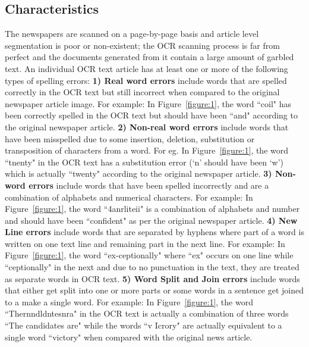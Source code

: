 \subsection{Characteristics}
The newspapers are scanned on a page-by-page basis and article level
segmentation is poor or non-existent; the OCR scanning process is far
from perfect and the documents generated from it contain a large
amount of garbled text.
An individual OCR text article has at least one or more of the following types of spelling errors:
 \textbf{1) Real word errors}	 include words that are spelled correctly in the OCR text but still incorrect when compared to the original newspaper article image. For example: In Figure~\ref{figure:1}, the word ``coil"  has been correctly spelled in the OCR text  but should have been ``and" according to the original newspaper article. 
 \textbf{2) Non-real word errors} include words that have been misspelled due to some insertion, deletion, substitution or transposition of characters from a word. For eg. In Figure~\ref{figure:1}, the word ``tnenty" in the OCR text has a substitution error (`n' should have been `w') which is actually ``twenty" according to the original newspaper article.
 \textbf{3) Non-word errors} include words that have been spelled incorrectly and are a combination of alphabets and numerical characters. For example: In Figure~\ref{figure:1}, the word ``4anrliteii" is a combination of alphabets and number and should have been ``confident" as per the original newspaper article.
\textbf{4) New Line errors} include words that are separated by hyphens where part of a word is written on one text line and remaining part in the next line. For example: In Figure~\ref{figure:1}, the word ``ex-ceptionally" where ``ex" occurs on one line while ``ceptionally" in the next and due to no punctuation in the text, they are treated as separate words in OCR text.
\textbf{5) Word Split and Join errors} include words that either get split into one or more parts or some words in a sentence get joined to a make a single word. For example: In Figure~\ref{figure:1}, the word ``Thernndldntesnra" in the OCR text is actually a combination of three words ``The candidates are" while the words ``v Icrory" are actually equivalent to a single word ``victory" when compared with the original news article.
